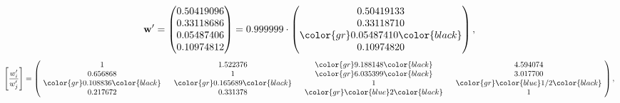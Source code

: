 \begin{example}
\begin{equation*}
\mathbf{w}^{\prime} =
\begin{pmatrix}
0.50419096\\
0.33118686\\
0.05487406\\
0.10974812
\end{pmatrix} =
0.999999\cdot
\begin{pmatrix}
0.50419133\\
0.33118710\\
\color{gr} 0.05487410\color{black} \\
0.10974820
\end{pmatrix},
\end{equation*}
\begin{equation*}
\left[ \frac{{w}^{\prime}_i}{{w}^{\prime}_j} \right] =
\begin{pmatrix}
$\,\,$ 1 $\,\,$ & $\,\,$1.522376$\,\,$ & $\,\,$\color{gr} 9.188148\color{black} $\,\,$ & $\,\,$4.594074$\,\,$ \\
$\,\,$0.656868$\,\,$ & $\,\,$ 1 $\,\,$ & $\,\,$\color{gr} 6.035399\color{black} $\,\,$ & $\,\,$3.017700  $\,\,$ \\
$\,\,$\color{gr} 0.108836\color{black} $\,\,$ & $\,\,$\color{gr} 0.165689\color{black} $\,\,$ & $\,\,$ 1 $\,\,$ & $\,\,$\color{gr} \color{blue}  1/2\color{black}  $\,\,$ \\
$\,\,$0.217672$\,\,$ & $\,\,$0.331378$\,\,$ & $\,\,$\color{gr} \color{blue} 2\color{black} $\,\,$ & $\,\,$ 1  $\,\,$ \\
\end{pmatrix},
\end{equation*}
\end{example}
\newpage
